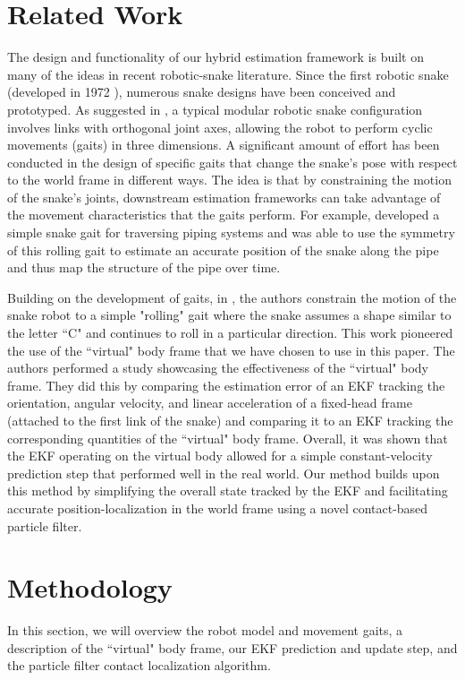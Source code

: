 \documentclass[letterpaper, 10 pt, conference]{ieeeconf}  %
\begin{document}
\section{Related Work}

The design and functionality of our hybrid estimation framework is built on many of the ideas in recent robotic-snake literature. Since the first robotic snake (developed in 1972 \cite{old_snakes}), numerous snake designs have been conceived and prototyped. As suggested in \cite{state_est_snake_robots}, a typical modular robotic snake configuration involves links with orthogonal joint axes, allowing the robot to perform cyclic movements (gaits) in three dimensions. A significant amount of effort has been conducted in the design of specific gaits that change the snake's pose with respect to the world frame in different ways. The idea is that by constraining the motion of the snake's joints, downstream estimation frameworks can take advantage of the movement characteristics that the gaits perform. For example, \cite{pipeline_inspection} developed a simple snake gait for traversing piping systems and was able to use the symmetry of this rolling gait to estimate an accurate position of the snake along the pipe and thus map the structure of the pipe over time.  

Building on the development of gaits, in \cite{state_est_snake_robots}, the authors constrain the motion of the snake robot to a simple "rolling" gait where the snake assumes a shape similar to the letter ``C" and continues to roll in a particular direction. This work pioneered the use of the ``virtual" body frame that we have chosen to use in this paper. The authors performed a study showcasing the effectiveness of the ``virtual" body frame. They did this by comparing the estimation error of an EKF tracking the orientation, angular velocity, and linear acceleration of a fixed-head frame (attached to the first link of the snake) and comparing it to an EKF tracking the corresponding quantities of the ``virtual" body frame. Overall, it was shown that the EKF operating on the virtual body allowed for a simple constant-velocity prediction step that performed well in the real world. Our method builds upon this method by simplifying the overall state tracked by the EKF and facilitating accurate position-localization in the world frame using a novel contact-based particle filter. 

\section{Methodology}
In this section, we will overview the robot model and movement gaits, a description of the ``virtual" body frame, our EKF prediction and update step, and the particle filter contact localization algorithm. 
\end{document}
